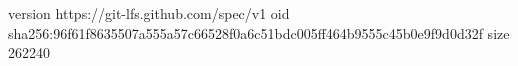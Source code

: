 version https://git-lfs.github.com/spec/v1
oid sha256:96f61f8635507a555a57c66528f0a6c51bdc005ff464b9555c45b0e9f9d0d32f
size 262240
